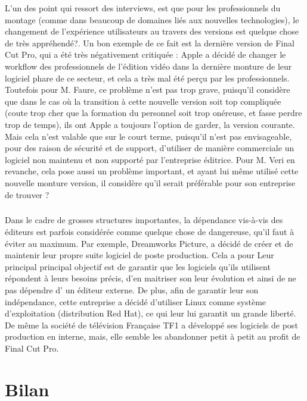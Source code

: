   L'un des point qui ressort des interviews, est que pour les professionnels du montage (comme dans
  beaucoup de domaines liés aux nouvelles technologies), le changement de l'expérience utilisateurs au
  travers des versions est quelque chose de très appréhendé?. Un bon exemple de ce fait est la dernière
  version de Final Cut Pro, qui a été très négativement critiquée \cite{FinalCutProXReviews} :
  Apple a décidé de changer le workflow  des professionnels de l'édition vidéo
  dans la dernière monture de leur logiciel phare de ce secteur, et cela a très mal été perçu par
  les professionnels. Toutefois pour M. Faure, ce problème n'est pas trop grave, puisqu'il considère que
  dans le cas où la transition à cette nouvelle version soit top compliquée (coute trop cher que la formation
  du personnel soit trop onéreuse, et fasse perdre trop de temps), ils ont Apple a toujours l'option de garder,
  la version courante.
  Mais cela n'est valable que sur le court terme, puisqu'il n'est pas envisageable, pour des raison de sécurité
  et de support, d'utiliser de manière commerciale un logiciel non maintenu et non supporté par l'entreprise
  éditrice. Pour M. Veri en revanche, cela pose aussi un problème important, et ayant lui même utilisé cette nouvelle
  monture version, il considère qu'il serait préférable pour son entreprise de trouver ?

  \subparagraph{}

  Dans le cadre de grosses structures importantes, la dépendance vis-à-vis des éditeurs est parfois considérée comme
  quelque chose de dangereuse, qu'il faut  à éviter au maximum. Par exemple, Dreamworks Picture,
  a décidé de créer et de maintenir leur propre suite logiciel \cite {Dreamworks} de poste
  production. Cela a pour Leur principal principal objectif  est de garantir que les logiciels qu'ils utilisent
  répondent à leurs besoins précis, d'en maitriser son leur évolution et ainsi de ne pas dépendre d' un éditeur
  externe. De plus, afin de garantir leur son indépendance, cette entreprise a décidé d'utiliser Linux comme
  système d'exploitation (distribution Red Hat), ce qui leur lui garantit un grande liberté. De même la société
  de télévision Française TF1 a développé ses logiciels de post production en interne, mais, elle semble
  les abandonner petit à petit au profit de Final Cut Pro.

\newpage
\section {Bilan}

